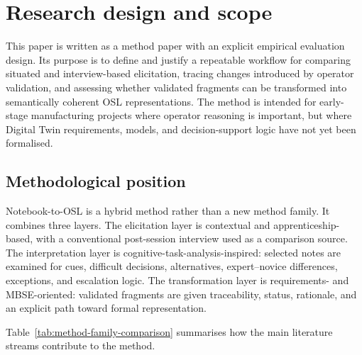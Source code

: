 \section{Research design and scope}
\label{sec:research-design}

This paper is written as a method paper with an explicit empirical evaluation design. Its purpose is to define and justify a repeatable workflow for comparing situated and interview-based elicitation, tracing changes introduced by operator validation, and assessing whether validated fragments can be transformed into semantically coherent OSL representations. The method is intended for early-stage manufacturing projects where operator reasoning is important, but where Digital Twin requirements, models, and decision-support logic have not yet been formalised.

\subsection{Methodological position}

Notebook-to-OSL is a hybrid method rather than a new method family. It combines three layers. The elicitation layer is contextual and apprenticeship-based, with a conventional post-session interview used as a comparison source. The interpretation layer is cognitive-task-analysis-inspired: selected notes are examined for cues, difficult decisions, alternatives, expert--novice differences, exceptions, and escalation logic. The transformation layer is requirements- and MBSE-oriented: validated fragments are given traceability, status, rationale, and an explicit path toward formal representation.

Table~\ref{tab:method-family-comparison} summarises how the main literature streams contribute to the method.

